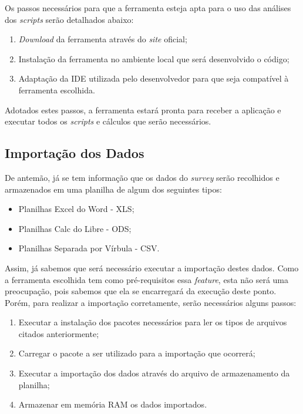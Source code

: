 Os passos necessários para que a ferramenta esteja apta para o uso das análises dos \textit{scripts} serão detalhados abaixo:

\begin{enumerate}
    \item \textit{Download} da ferramenta através do \textit{site} oficial;
    \item Instalação da ferramenta no ambiente local que será desenvolvido o código;
    \item Adaptação da IDE utilizada pelo desenvolvedor para que seja compatível à ferramenta escolhida.
\end{enumerate}

Adotados estes passos, a ferramenta estará pronta para receber a aplicação e executar todos os \textit{scripts} e cálculos que serão
necessários.

\subsection{Importação dos Dados}
\label{sub:importa_o_dos_dados}
De antemão, já se tem informação que  os dados do \textit{survey} serão recolhidos e armazenados em uma planilha de algum dos seguintes tipos:

\begin{itemize}
    \item Planilhas Excel do Word - XLS;
    \item Planilhas Calc do Libre - ODS;
    \item Planilhas Separada por Vírbula - CSV.
\end{itemize}

Assim, já sabemos que será necessário executar a importação destes dados. Como a ferramenta escolhida tem como pré-requisitos
essa \textit{feature}, esta não será uma preocupação, pois sabemos que ela se encarregará da execução deste ponto. Porém, para realizar
a importação corretamente, serão necessários alguns passos:

\begin{enumerate}
    \item Executar a instalação dos pacotes necessários para ler os tipos de arquivos citados anteriormente;
    \item Carregar o pacote a ser utilizado para a importação que ocorrerá;
    \item Executar a importação dos dados através do arquivo de armazenamento da planilha;
    \item Armazenar em memória RAM os dados importados.
\end{enumerate}

